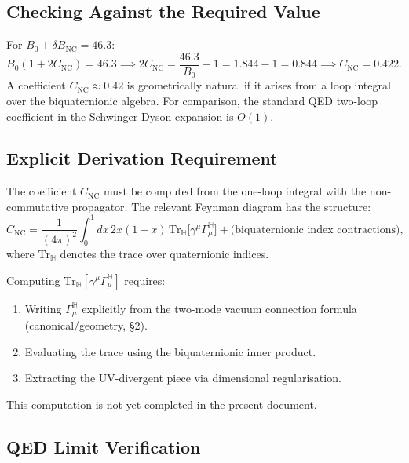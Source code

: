 \documentclass[11pt,a4paper]{article}
\theoremstyle{remark}
\begin{document}
\subsection{Checking Against the Required Value}

For $B_0 + \delta B_{\mathrm{NC}} = 46.3$:
\begin{equation}
  B_0(1 + 2 C_{\mathrm{NC}}) = 46.3
  \implies 2 C_{\mathrm{NC}} = \frac{46.3}{B_0} - 1 = 1.844 - 1 = 0.844
  \implies C_{\mathrm{NC}} = 0.422.
  \label{eq:C_NC_required}
\end{equation}
A coefficient $C_{\mathrm{NC}} \approx 0.42$ is geometrically natural if it arises from a
loop integral over the biquaternionic algebra. For comparison, the standard QED two-loop
coefficient in the Schwinger-Dyson expansion is $O(1)$.

\subsection{Explicit Derivation Requirement}

The coefficient $C_{\mathrm{NC}}$ must be computed from the one-loop integral with the
non-commutative propagator. The relevant Feynman diagram has the structure:
\begin{equation}
  C_{\mathrm{NC}} = \frac{1}{(4\pi)^2}\int_0^1 dx\,2x(1-x)\,
    \mathrm{Tr}_{\mathbb{H}}\bigl[\gamma^\mu\Gamma_\mu^{\mathbb{H}}\bigr]
    + \text{(biquaternionic index contractions)},
  \label{eq:C_NC_integral}
\end{equation}
where $\mathrm{Tr}_{\mathbb{H}}$ denotes the trace over quaternionic indices.

Computing $\mathrm{Tr}_{\mathbb{H}}[\gamma^\mu \Gamma_\mu^{\mathbb{H}}]$ requires:
\begin{enumerate}
  \item Writing $\Gamma_\mu^{\mathbb{H}}$ explicitly from the two-mode vacuum
    connection formula (canonical/geometry, \S2).
  \item Evaluating the trace using the biquaternionic inner product.
  \item Extracting the UV-divergent piece via dimensional regularisation.
\end{enumerate}
This computation is not yet completed in the present document.

\subsection{QED Limit Verification}
\end{document}
